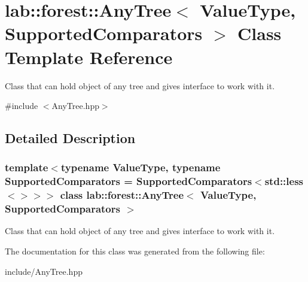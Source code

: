 \hypertarget{classlab_1_1forest_1_1AnyTree}{}\section{lab\+:\+:forest\+:\+:Any\+Tree$<$ Value\+Type, Supported\+Comparators $>$ Class Template Reference}
\label{classlab_1_1forest_1_1AnyTree}


Class that can hold object of any tree and gives interface to work with it.  




{\ttfamily \#include $<$Any\+Tree.\+hpp$>$}



\subsection{Detailed Description}
\subsubsection*{template$<$typename Value\+Type, typename Supported\+Comparators = Supported\+Comparators$<$std\+::less$<$$>$$>$$>$\newline
class lab\+::forest\+::\+Any\+Tree$<$ Value\+Type, Supported\+Comparators $>$}

Class that can hold object of any tree and gives interface to work with it. 

The documentation for this class was generated from the following file\+:\begin{DoxyCompactItemize}
\item 
include/Any\+Tree.\+hpp\end{DoxyCompactItemize}
